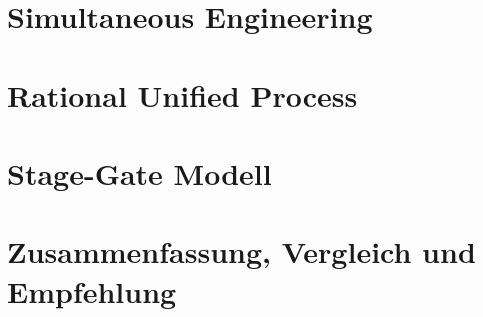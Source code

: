 \documentclass[a4paper, twopage]{scrreprt}
\begin{document}
\chapter{Simultaneous Engineering}



\chapter{Rational Unified Process}



\chapter{Stage-Gate Modell}



\chapter{Zusammenfassung, Vergleich und Empfehlung}
\label{ch:zusammenfassung}



\nocite{*}
\printbibliography

\listoffigures
\end{document}

